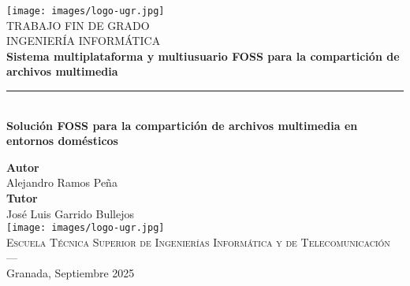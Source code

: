 \begin{titlepage}
 
 
\newlength{\centeroffset}
\setlength{\centeroffset}{-0.5\oddsidemargin}
\addtolength{\centeroffset}{0.5\evensidemargin}
\thispagestyle{empty}

\noindent\hspace*{\centeroffset}\begin{minipage}{\textwidth}

\centering
\texttt{[image: images/logo-ugr.jpg]}\\[1.4cm]

\textsc{ \Large TRABAJO FIN DE GRADO\\[0.2cm]}
\textsc{ INGENIERÍA INFORMÁTICA}\\[1cm]
% 
{\Huge\bfseries Sistema multiplataforma y multiusuario FOSS para la compartición de archivos multimedia\\
}
\noindent\rule[-1ex]{\textwidth}{3pt}\\[3.5ex]
{\large\bfseries Solución FOSS para la compartición de archivos multimedia en entornos domésticos\\[1.5cm]}
\end{minipage}

\vspace{2.5cm}
\noindent\hspace*{\centeroffset}\begin{minipage}{\textwidth}
\centering

\textbf{Autor}\\ {Alejandro Ramos Peña}\\[2.5ex]
\textbf{Tutor}\\
{José Luis Garrido Bullejos}\\[2cm]
\texttt{[image: images/logo-ugr.jpg]}\\[0.1cm]
\textsc{Escuela Técnica Superior de Ingenierías Informática y de Telecomunicación}\\
\textsc{---}\\
Granada, Septiembre 2025
\end{minipage}
\end{titlepage}


